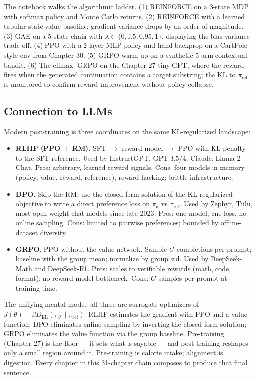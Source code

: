 The notebook walks the algorithmic ladder. (1) REINFORCE on a 3-state MDP with softmax policy and Monte Carlo returns. (2) REINFORCE with a learned tabular state-value baseline; gradient variance drops by an order of magnitude. (3) GAE on a 5-state chain with $\lambda\in\{0,0.5,0.95,1\}$, displaying the bias-variance trade-off. (4) PPO with a 2-layer MLP policy and hand backprop on a CartPole-style env from Chapter 30. (5) GRPO warm-up on a synthetic 5-arm contextual bandit. (6) The climax: GRPO on the Chapter 27 tiny GPT, where the reward fires when the generated continuation contains a target substring; the KL to $\pi_{\mathrm{ref}}$ is monitored to confirm reward improvement without policy collapse.

\subsection*{Connection to LLMs}

Modern post-training is three coordinates on the same KL-regularized landscape:

\begin{itemize}
    \item \textbf{RLHF (PPO + RM).} SFT $\to$ reward model $\to$ PPO with KL penalty to the SFT reference. Used by InstructGPT, GPT-3.5/4, Claude, Llama-2-Chat. Pros: arbitrary, learned reward signals. Cons: four models in memory (policy, value, reward, reference); reward hacking; brittle infrastructure.
    \item \textbf{DPO.} Skip the RM; use the closed-form solution of the KL-regularized objective to write a direct preference loss on $\pi_\theta$ vs $\pi_{\mathrm{ref}}$. Used by Zephyr, T\"ulu, most open-weight chat models since late 2023. Pros: one model, one loss, no online sampling. Cons: limited to pairwise preferences; bounded by offline-dataset diversity.
    \item \textbf{GRPO.} PPO without the value network. Sample $G$ completions per prompt; baseline with the group mean; normalize by group std. Used by DeepSeek-Math and DeepSeek-R1. Pros: scales to verifiable rewards (math, code, format); no reward-model bottleneck. Cons: $G$ samples per prompt at training time.
\end{itemize}

The unifying mental model: all three are surrogate optimizers of $J(\theta)-\beta D_{\mathrm{KL}}(\pi_\theta\|\pi_{\mathrm{ref}})$. RLHF estimates the gradient with PPO and a value function; DPO eliminates online sampling by inverting the closed-form solution; GRPO eliminates the value function via the group baseline. Pre-training (Chapter 27) is the floor — it sets what is sayable — and post-training reshapes only a small region around it. Pre-training is calorie intake; alignment is digestion. Every chapter in this 31-chapter chain composes to produce that final sentence.
